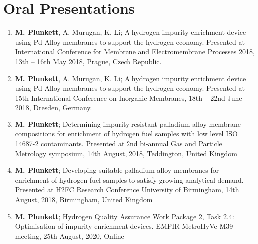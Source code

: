 \documentclass[a4paper,12pt]{report}
\begin{document}
\section*{Oral Presentations}
\begin{enumerate}
    \item \textbf{M. Plunkett}, A. Murugan, K. Li; A hydrogen impurity enrichment device using Pd-Alloy membranes to support the hydrogen economy. Presented at International Conference for Membrane and Electromembrane Processes 2018, 13th – 16th May 2018, Prague, Czech Republic.
    \item \textbf{M. Plunkett}, A. Murugan, K. Li; A hydrogen impurity enrichment device using Pd-Alloy membranes to support the hydrogen economy. Presented at 15th International Conference on Inorganic Membranes, 18th – 22nd June 2018, Dresden, Germany. 
    \item \textbf{M. Plunkett}; Determining impurity resistant palladium alloy membrane compositions for enrichment of hydrogen fuel samples with low level ISO 14687-2 contaminants. Presented at 2nd bi-annual Gas and Particle Metrology symposium, 14th August, 2018, Teddington, United Kingdom 
    \item \textbf{M. Plunkett}; Developing suitable palladium alloy membranes for enrichment of hydrogen fuel samples to satisfy growing analytical demand. Presented at H2FC Research Conference University of Birmingham, 14th August, 2018, Birmingham, United Kingdom 
    \item \textbf{M. Plunkett}; Hydrogen Quality Assurance Work Package 2, Task 2.4: Optimisation of impurity enrichment devices. EMPIR MetroHyVe M39 meeting, 25th August, 2020, Online 
\end{enumerate}
\end{document}
